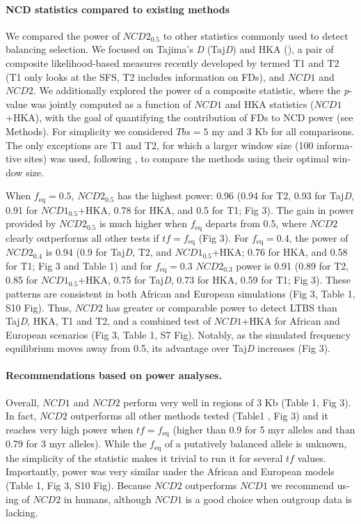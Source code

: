 \begin{refsection}
\begin{otherlanguage}{english}
\paragraph{NCD statistics compared to existing methods} We compared the power of $NCD2_{0.5}$ to other statistics commonly used to detect balancing selection. We focused on Tajima’s \emph{D} (Taj\emph{D}) and HKA (\cite{Hudson1987,tajima1989statistical}), a pair of composite likelihood-based measures recently developed by \textcite{DeGiorgio2014} termed T1 and T2 (T1 only looks at the SFS, T2 includes information on FDs), and $NCD1$ and $NCD2$. We additionally explored the power of a composite statistic, where the \emph{p}-value was jointly computed as a function of $NCD1$ and HKA statistics ($NCD1$+HKA), with the goal of quantifying the contribution of FDs to NCD power (see Methods). For simplicity we considered $Tbs=5$ my and 3 Kb for all comparisons. The only exceptions are T1 and T2, for which a larger window size (100 informative sites) was used, following \textcite{DeGiorgio2014}, to compare the methods using their optimal window size. 

When $f_{\mathrm{eq}}=0.5$, $NCD2_{\mathrm{0.5}}$ has the highest power: 0.96 (0.94 for T2, 0.93 for Taj\emph{D}, 0.91 for $NCD1_{0.5}$+HKA, 0.78 for HKA, and 0.5 for T1; Fig 3). The gain in power provided by $NCD2_{0.5}$ is much higher when $f_{\mathrm{eq}}$ departs from 0.5, where $NCD2$ clearly outperforms all other tests if $tf=f_{\mathrm{eq}}$ (Fig 3). For $f_{\mathrm{eq}}=0.4$, the power of $NCD2_{0.4}$ is 0.94 (0.9 for Taj\emph{D}, T2, and $NCD1_{0.5}$+HKA; 0.76 for HKA, and 0.58 for T1; Fig 3 and Table 1) and for $f_{\mathrm{eq}}=0.3$ $NCD2_{0.3}$ power is 0.91 (0.89 for T2, 0.85 for $NCD1_{0.5}$+HKA, 0.75 for Taj\emph{D}, 0.73 for HKA, 0.59 for T1; Fig 3). These patterns are consistent in both African and European simulations (Fig 3, Table 1, S10 Fig). Thus, $NCD2$ has greater or comparable power to detect LTBS than Taj\emph{D}, HKA, T1 and T2, and a combined test of $NCD1$+HKA for African and European scenarios (Fig 3, Table 1, S7 Fig). Notably, as the simulated frequency equilibrium moves away from 0.5, its advantage over Taj\emph{D} increases (Fig 3).

\paragraph{Recommendations based on power analyses.} Overall, $NCD1$ and $NCD2$ perform very well in regions of 3 Kb (Table 1, Fig 3). In fact, $NCD2$ outperforms all other methods tested (Table1 , Fig 3) and it reaches very high power when $tf=f_{\mathrm{eq}}$ (higher than 0.9 for 5 myr alleles and than 0.79 for 3 myr alleles). While the $f_{\mathrm{eq}}$ of a putatively balanced allele is unknown, the simplicity of the statistic makes it trivial to run it for several $tf$ values. Importantly, power was very similar under the African and European models (Table 1, Fig 3, S10 Fig). Because $NCD2$ outperforms $NCD1$ we recommend using of $NCD2$ in humans, although $NCD1$ is a good choice when outgroup data is lacking.




\end{otherlanguage}
\end{refsection}
